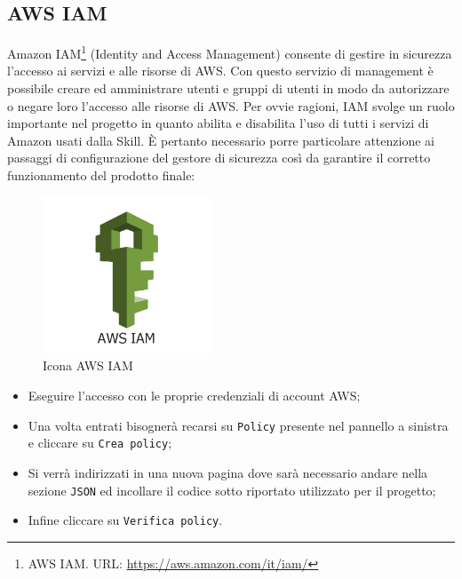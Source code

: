\subsection{AWS IAM}
\label{aws-iam}
Amazon IAM\footnote{AWS IAM. URL: \href{https://aws.amazon.com/it/iam/}{https://aws.amazon.com/it/iam/}} (Identity and Access Management) consente di gestire in sicurezza l'accesso ai servizi e alle risorse di AWS. Con questo servizio di management è possibile creare ed amministrare utenti e gruppi di utenti in modo da autorizzare o negare loro l'accesso alle risorse di AWS. Per ovvie ragioni, IAM svolge un ruolo importante nel progetto in quanto abilita e disabilita l'uso di tutti i servizi di Amazon usati dalla Skill. È pertanto necessario porre particolare attenzione ai passaggi di configurazione del gestore di sicurezza così da garantire il corretto funzionamento del prodotto finale:
\begin{minipage}{0.4\textwidth}
	\begin{figure}[H]
		\includegraphics[width=5cm]{immagini/amazon-iam.png}
		\caption{\label{fig:icona_aws_iam}Icona AWS IAM}
	\end{figure}
\end{minipage}
\begin{minipage}{0.6\textwidth}
	\begin{itemize}
		\item Eseguire l'accesso con le proprie credenziali di account AWS;
    	\item Una volta entrati bisognerà recarsi su \texttt{Policy} presente nel pannello a sinistra e cliccare su \texttt{Crea policy};
    	\item Si verrà indirizzati in una nuova pagina dove sarà necessario andare nella sezione \texttt{JSON} ed incollare il codice sotto riportato utilizzato per il progetto;
    	\item Infine cliccare su \texttt{Verifica policy}.
	\end{itemize}
\end{minipage}

